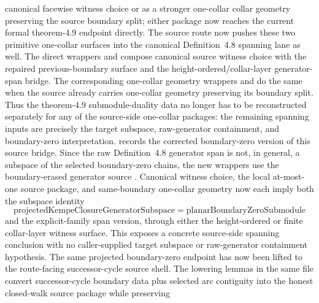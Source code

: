 \documentclass[11pt]{article}
\begin{document}
canonical facewise witness choice or as a stronger one-collar collar geometry
preserving the source boundary split; either package now reaches the current
formal theorem-4.9 endpoint directly.
The source route now pushes these two primitive one-collar surfaces into the
canonical Definition~4.8 spanning lane as well.  The direct wrappers
and
compose canonical source witness choice with the repaired previous-boundary
surface and the height-ordered/collar-layer generator-span bridge.  The
corresponding one-collar geometry wrappers
and
do the same when the source already carries one-collar geometry preserving its
boundary split.  Thus the theorem-4.9 submodule-duality data no longer has to
be reconstructed separately for any of the source-side one-collar packages:
the remaining spanning inputs are precisely the target subspace, raw-generator
containment, and boundary-zero interpretation.
 records the corrected
boundary-zero version of this source bridge.  Since the raw
Definition~4.8 generator span is not, in general, a subspace of the selected
boundary-zero chains, the new wrappers use the boundary-erased generator
source
.  Canonical witness choice,
the local at-most-one source package, and same-boundary one-collar geometry
now each imply both the subspace identity
\[
  \mathrm{projectedKempeClosureGeneratorSubspace}
  =
  \mathrm{planarBoundaryZeroSubmodule}
\]
and the explicit-family span version, through either the height-ordered or
finite collar-layer witness surface.  This exposes a concrete source-side
spanning conclusion with no caller-supplied target subspace or raw-generator
containment hypothesis.  The same projected boundary-zero endpoint has now
been lifted to the route-facing successor-cycle source shell.  The lowering
lemmas in the same file convert successor-cycle boundary data plus selected
arc contiguity into the honest closed-walk source package while preserving
\end{document}

